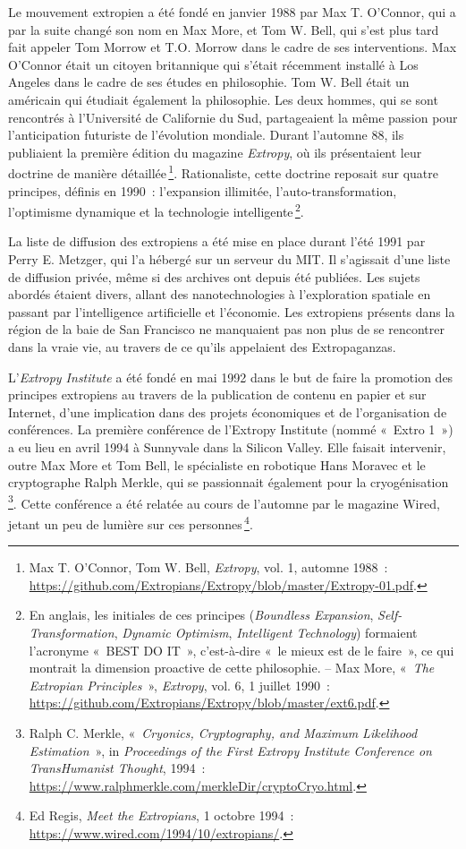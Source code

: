 \documentclass[a4paper,notitlepage]{article}
\newcommand{\eng}[1]{{\NoAutoSpaceBeforeFDP\emph{#1}}}  %
\newcommand{\sfootnote}{\,\footnote}
\begin{document}
Le mouvement extropien a été fondé en janvier 1988 par Max T. O'Connor, qui a par la suite changé son nom en Max More, et Tom W. Bell, qui s'est plus tard fait appeler Tom Morrow et T.O. Morrow dans le cadre de ses interventions. Max O'Connor était un citoyen britannique qui s'était récemment installé à Los Angeles dans le cadre de ses études en philosophie. Tom W. Bell était un américain qui étudiait également la philosophie. Les deux hommes, qui se sont rencontrés à l'Université de Californie du Sud, partageaient la même passion pour l'anticipation futuriste de l'évolution mondiale. Durant l'automne 88, ils publiaient la première édition du magazine \eng{Extropy}, où ils présentaient leur doctrine de manière détaillée\sfootnote{Max T. O'Connor, Tom W. Bell, \eng{Extropy}, vol. 1, automne 1988~: \url{https://github.com/Extropians/Extropy/blob/master/Extropy-01.pdf}.}. Rationaliste, cette doctrine reposait sur quatre principes, définis en 1990~: l'expansion illimitée, l'auto-transformation, l'optimisme dynamique et la technologie intelligente\sfootnote{En anglais, les initiales de ces principes (\eng{Boundless Expansion}, \eng{Self-Transformation}, \eng{Dynamic Optimism}, \eng{Intelligent Technology}) formaient l'acronyme «~BEST DO IT~», c'est-à-dire «~le mieux est de le faire~», ce qui montrait la dimension proactive de cette philosophie. -- Max More, «~\eng{The Extropian Principles}~», \eng{Extropy}, vol. 6, 1\ier{} juillet 1990~: \url{https://github.com/Extropians/Extropy/blob/master/ext6.pdf}.}.

La liste de diffusion des extropiens a été mise en place durant l'été 1991 par Perry E. Metzger, qui l'a hébergé sur un serveur du MIT. Il s'agissait d'une liste de diffusion privée, même si des archives ont depuis été publiées. Les sujets abordés étaient divers, allant des nanotechnologies à l'exploration spatiale en passant par l'intelligence artificielle et l'économie. Les extropiens présents dans la région de la baie de San Francisco ne manquaient pas non plus de se rencontrer dans la vraie vie, au travers de ce qu'ils appelaient des Extropaganzas.

L'\eng{Extropy Institute} a été fondé en mai 1992 dans le but de faire la promotion des principes extropiens au travers de la publication de contenu en papier et sur Internet, d'une implication dans des projets économiques et de l'organisation de conférences. La première conférence de l'Extropy Institute (nommé «~Extro 1~») a eu lieu en avril 1994 à Sunnyvale dans la Silicon Valley. Elle faisait intervenir, outre Max More et Tom Bell, le spécialiste en robotique Hans Moravec et le cryptographe Ralph Merkle, qui se passionnait également pour la cryogénisation\sfootnote{Ralph C. Merkle, «~\eng{Cryonics, Cryptography, and Maximum Likelihood Estimation}~», in \eng{Proceedings of the First Extropy Institute Conference on TransHumanist Thought}, 1994~: \url{https://www.ralphmerkle.com/merkleDir/cryptoCryo.html}.}. Cette conférence a été relatée au cours de l'automne par le magazine Wired, jetant un peu de lumière sur ces personnes\sfootnote{Ed Regis, \eng{Meet the Extropians}, 1\ier{} octobre 1994~: \url{https://www.wired.com/1994/10/extropians/}.}.
\end{document}
